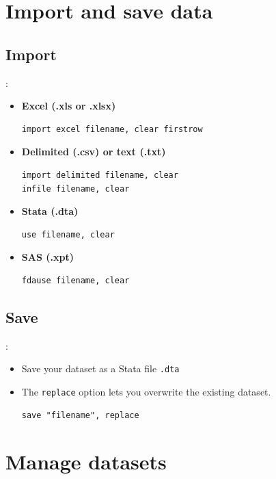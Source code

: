 \section{Import and save data}
\subsection{Import}
\begin{frame}[fragile]{\secname: \subsecname}
\begin{itemize}
	\item \textbf{Excel (.xls or .xlsx)} \begin{verbatim}import excel filename, clear firstrow \end{verbatim}
	\item \textbf{Delimited (.csv) or text (.txt)} 
		\begin{verbatim}import delimited filename, clear
infile filename, clear\end{verbatim}
	\item \textbf{Stata (.dta)} \begin{verbatim}use filename, clear \end{verbatim}
	\item \textbf{SAS (.xpt)} \begin{verbatim}fdause filename, clear \end{verbatim}
\end{itemize}
\end{frame}

\subsection{Save}
\begin{frame}[fragile]{\secname: \subsecname}
\begin{itemize}
\item Save your dataset as a Stata file \verb|.dta|
\item The \verb|replace| option lets you overwrite the existing dataset.
\begin{verbatim}
save "filename", replace
\end{verbatim} 
\end{itemize}
\end{frame}


\section{Manage datasets}
